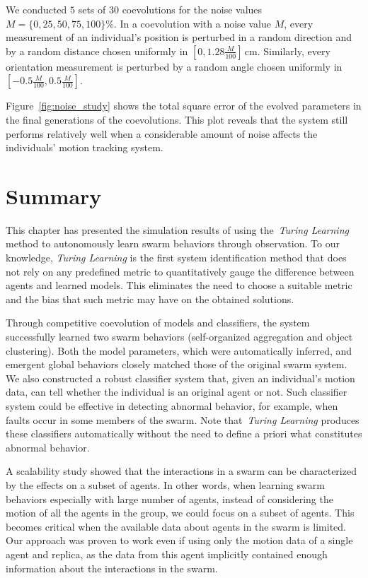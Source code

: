 We conducted $5$ sets of $30$ coevolutions for the noise values $M=\{0, 25, 50, 75, 100\}\%$. In a coevolution with a noise value $M$, every measurement of an individual's position is perturbed in a random direction and by a random distance chosen uniformly in $\left[0, 1.28\frac{M}{100}\right] \,\textrm{cm}$. Similarly, every orientation measurement is perturbed by a random angle chosen uniformly in $\left[-0.5\frac{M}{100}, 0.5\frac{M}{100}\right]$.

Figure~\ref{fig:noise_study} shows the total square error of the evolved parameters in the final generations of the coevolutions. This plot reveals that the system still performs relatively well when a considerable amount of noise affects the individuals' motion tracking system.

\section{Summary}\label{sec:summary_simulation_swarm}

This chapter has presented the simulation results of using the~\textit{Turing Learning} method to autonomously learn swarm behaviors through observation. To our knowledge, \textit{Turing Learning} is the first system identification method that does not rely on any predefined metric to quantitatively gauge the difference between agents and learned models. This eliminates the need to choose a suitable metric and the bias that such metric may have on the obtained solutions. 

Through competitive coevolution of models and classifiers, the system successfully learned two swarm behaviors (self-organized aggregation and object clustering). Both the model parameters, which were automatically inferred, and emergent global behaviors closely matched those of the original swarm system. We also constructed a robust classifier system that, given an individual's motion data, can tell whether the individual is an original agent or not. Such classifier system could be effective in detecting abnormal behavior, for example, when faults occur in some members of the swarm. Note that~\textit{Turing Learning} produces these classifiers automatically without the need to define a priori what constitutes abnormal behavior. 

A scalability study showed that the interactions in a swarm can be characterized by the effects on a subset of agents. In other words, when learning swarm behaviors especially with large number of agents, instead of considering the motion of all the agents in the group, we could focus on a subset of agents. This becomes critical when the available data about agents in the swarm is limited. Our approach was proven to work even if using only the motion data of a single agent and replica, as the data from this agent implicitly contained enough information about the interactions in the swarm.   

